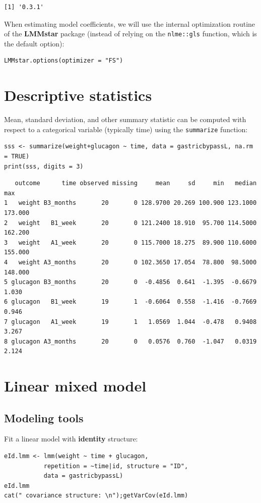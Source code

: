 \documentclass[12pt]{article}
\begin{document}
\begin{verbatim}
[1] '0.3.1'
\end{verbatim}


When estimating model coefficients, we will use the internal
optimization routine of the \textbf{LMMstar} package (instead of relying on
the \texttt{nlme::gls} function, which is the default option):
\lstset{language=r,label= ,caption= ,captionpos=b,numbers=none}
\begin{lstlisting}
LMMstar.options(optimizer = "FS")
\end{lstlisting}

\clearpage

\section{Descriptive statistics}
\label{sec:orgcc3e9dc}
Mean, standard deviation, and other summary statistic can be computed
with respect to a categorical variable (typically time) using the
\texttt{summarize} function:
\lstset{language=r,label= ,caption= ,captionpos=b,numbers=none}
\begin{lstlisting}
sss <- summarize(weight+glucagon ~ time, data = gastricbypassL, na.rm = TRUE)
print(sss, digits = 3)
\end{lstlisting}

\begin{verbatim}
   outcome      time observed missing     mean     sd     min   median     max
1   weight B3_months       20       0 128.9700 20.269 100.900 123.1000 173.000
2   weight   B1_week       20       0 121.2400 18.910  95.700 114.5000 162.200
3   weight   A1_week       20       0 115.7000 18.275  89.900 110.6000 155.000
4   weight A3_months       20       0 102.3650 17.054  78.800  98.5000 148.000
5 glucagon B3_months       20       0  -0.4856  0.641  -1.395  -0.6679   1.030
6 glucagon   B1_week       19       1  -0.6064  0.558  -1.416  -0.7669   0.946
7 glucagon   A1_week       19       1   1.0569  1.044  -0.478   0.9408   3.267
8 glucagon A3_months       20       0   0.0576  0.760  -1.047   0.0319   2.124
\end{verbatim}


\clearpage

\section{Linear mixed model}
\label{sec:org08e4dbe}
\subsection{Modeling tools}
\label{sec:org12c57a0}
Fit a linear model with \textbf{identity} structure:
\lstset{language=r,label= ,caption= ,captionpos=b,numbers=none}
\begin{lstlisting}
eId.lmm <- lmm(weight ~ time + glucagon,
	       repetition = ~time|id, structure = "ID",
	       data = gastricbypassL)
eId.lmm
cat(" covariance structure: \n");getVarCov(eId.lmm)
\end{lstlisting}
\end{document}
